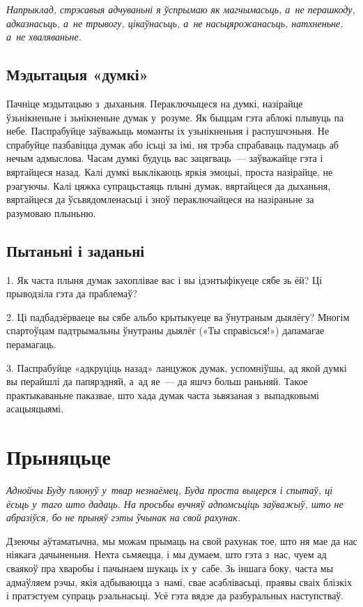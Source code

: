 \emph{Напрыклад, стрэсавыя адчуваньні я ўспрымаю як магчымасьць, а~не перашкоду, адказнасьць, а~не трывогу, цікаўнасьць, а~не насьцярожанасьць, натхненьне, а~не хваляваньне.}

\subsection*{Мэдытацыя «думкі»}

Пачніце мэдытацыю з~дыханьня. Пераключыцеся на думкі, назірайце ўзьнікненьне і зьнікненьне думак у~розуме. Як быццам гэта аблокі плывуць па небе. Паспрабуйце заўважыць моманты іх узьнікненьня і распушчэньня. Не спрабуйце пазбавіцца думак або ісьці за імі, ня трэба спрабаваць падумаць аб нечым адмыслова. Часам думкі будуць вас зацягваць~--- заўважайце гэта і вяртайцеся назад. Калі думкі выклікаюць яркія эмоцыі, проста назірайце, не рэагуючы. Калі цяжка супрацьстаяць плыні думак, вяртайцеся да дыханьня, вяртайцеся да ўсьвядомленасьці і зноў пераключайцеся на назіраньне за разумоваю плыньню.

\subsection*{Пытаньні і заданьні}

1. Як часта плыня думак захоплівае вас і вы ідэнтыфікуеце сябе зь ёй? Ці прыводзіла гэта да праблемаў?

2. Ці падбадзёрваеце вы сябе альбо крытыкуеце ва ўнутраным дыялёгу? Многім спартоўцам падтрымальны ўнутраны дыялёг («Ты справісься!») дапамагае перамагаць.

3. Паспрабуйце «адкруціць назад» ланцужок думак, успомніўшы, ад якой думкі вы перайшлі да папярэдняй, а~ад яе~--- да яшчэ больш раньняй. Такое практыкаваньне паказвае, што хада думак часта зьвязаная з~выпадковымі асацыяцыямі.


\section{Прыняцьце}

\emph{Аднойчы Буду плюнуў у~твар незнаёмец, Буда проста выцерся і спытаў, ці ёсьць у~таго што дадаць. На просьбы вучняў адпомсьціць заўважыў, што не абразіўся, бо не прыняў гэты ўчынак на свой рахунак.} 

Дзеючы аўтаматычна, мы можам прымаць на свой рахунак тое, што ня мае да нас ніякага дачыненьня. Нехта сьмяецца, і мы думаем, што гэта з~нас, чуем ад сваякоў пра хваробы і пачынаем шукаць іх у~сабе. Зь іншага боку, часта мы адмаўляем рэчы, якія адбываюцца з~намі, свае асаблівасьці, праявы сваіх блізкіх і пратэстуем супраць рэальнасьці. Усё гэта вядзе да разбуральных наступстваў.

